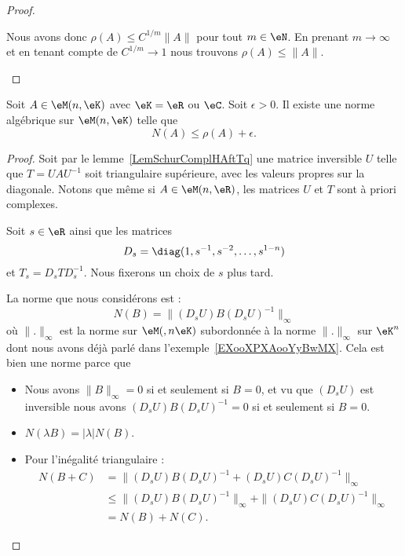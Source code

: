 \begin{proof}
\begin{subproof}
            Nous avons donc \( \rho(A)\leq C^{1/m}\| A \|\) pour tout \( m\in\eN\). En prenant \( m\to \infty\) et en tenant compte de \( C^{1/m}\to 1\) nous trouvons \( \rho(A)\leq \| A \|\).
    \end{subproof}
\end{proof}

\begin{lemma}        \label{LEMooGBLJooCPvxNl}
    Soit \( A\in \eM(n,\eK)\) avec \( \eK=\eR\) ou \( \eC\). Soit \( \epsilon>0\). Il existe une norme algébrique sur \( \eM(n,\eK)\) telle que
    \begin{equation}
        N(A)\leq \rho(A)+\epsilon.
    \end{equation}
\end{lemma}

\begin{proof}
    Soit par le lemme~\ref{LemSchurComplHAftTq} une matrice inversible \( U\) telle que \( T=UAU^{-1}\) soit triangulaire supérieure, avec les valeurs propres sur la diagonale. Notons que même si \( A\in \eM(n,\eR)\), les matrices \( U\) et \( T\) sont à priori complexes.

    Soit \( s\in \eR\) ainsi que les matrices
    \begin{equation}
        D_s=\diag(1,s^{-1},s^{-2},\ldots, s^{1-n})
    \end{equation}
    et \( T_s=D_sTD_s^{-1}\). Nous fixerons un choix de \( s\) plus tard.

    La norme que nous considérons est :
    \begin{equation}
        N(B)=\| (D_sU)B(D_sU)^{-1} \|_{\infty}
    \end{equation}
    où \( \| . \|_{\infty}\) est la norme sur \( \eM(,n\eK)\) subordonnée à la norme \( \| . \|_{\infty}\) sur \( \eK^n\) dont nous avons déjà parlé dans l'exemple~\ref{EXooXPXAooYyBwMX}. Cela est bien une norme parce que
    \begin{itemize}
        \item Nous avons \( \| B \|_{\infty}=0\) si et seulement si \( B=0\), et vu que \( (D_sU)\) est inversible nous avons \( (D_sU)B(D_sU)^{-1}=0\) si et seulement si \( B=0\).
        \item \( N(\lambda B)=| \lambda |N(B)\).
        \item Pour l'inégalité triangulaire :
            \begin{subequations}
                \begin{align}
             N(B+C)&=\| (D_sU)B(D_sU)^{-1}+(D_sU)C(D_sU)^{-1} \|_{\infty}\\
             &\leq  \| (D_sU)B(D_sU)^{-1}\|_{\infty} +\| (D_sU)C(D_sU)^{-1} \|_{\infty} \\
             &=N(B)+N(C).
                \end{align}
            \end{subequations}
    \end{itemize}


\end{proof}
